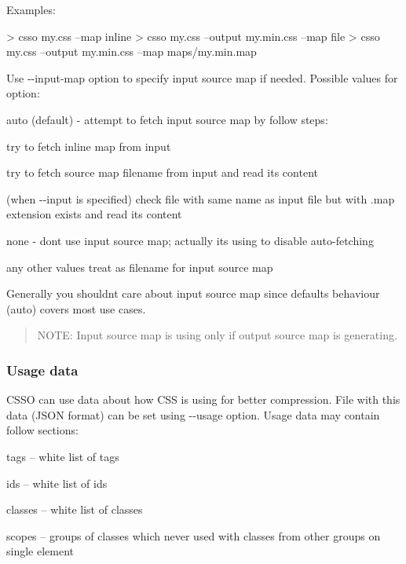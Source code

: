 Examples\+:


\begin{DoxyCode}
> csso my.css --map inline
> csso my.css --output my.min.css --map file
> csso my.css --output my.min.css --map maps/my.min.map
\end{DoxyCode}


Use {\ttfamily -\/-\/input-\/map} option to specify input source map if needed. Possible values for option\+:


\begin{DoxyItemize}
\item {\ttfamily auto} (default) -\/ attempt to fetch input source map by follow steps\+:
\begin{DoxyItemize}
\item try to fetch inline map from input
\item try to fetch source map filename from input and read its content
\item (when {\ttfamily -\/-\/input} is specified) check file with same name as input file but with {\ttfamily .map} extension exists and read its content
\end{DoxyItemize}
\item {\ttfamily none} -\/ don\textquotesingle{}t use input source map; actually it\textquotesingle{}s using to disable {\ttfamily auto}-\/fetching
\item any other values treat as filename for input source map
\end{DoxyItemize}

Generally you shouldn\textquotesingle{}t care about input source map since defaults behaviour ({\ttfamily auto}) covers most use cases.

\begin{quote}
N\+O\+TE\+: Input source map is using only if output source map is generating. \end{quote}


\subsubsection*{Usage data}

{\ttfamily C\+S\+SO} can use data about how {\ttfamily C\+SS} is using for better compression. File with this data ({\ttfamily J\+S\+ON} format) can be set using {\ttfamily -\/-\/usage} option. Usage data may contain follow sections\+:


\begin{DoxyItemize}
\item {\ttfamily tags} – white list of tags
\item {\ttfamily ids} – white list of ids
\item {\ttfamily classes} – white list of classes
\item {\ttfamily scopes} – groups of classes which never used with classes from other groups on single element
\end{DoxyItemize}

